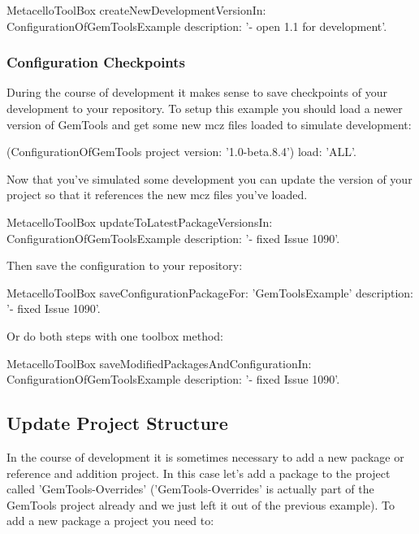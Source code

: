 \documentclass[a4paper,10pt,twoside]{book}
\begin{document}
\begin{code}{}
MetacelloToolBox
  createNewDevelopmentVersionIn: ConfigurationOfGemToolsExample
  description: '- open 1.1 for development'.
\end{code}

\subsubsection{Configuration Checkpoints}

During the course of development it makes sense to save checkpoints of your development to your repository. To setup this example you should load a newer version of GemTools and get some new mcz files loaded to simulate development:

\begin{code}{}
(ConfigurationOfGemTools project version: '1.0-beta.8.4')
  load: 'ALL'.
\end{code}  

Now that you've simulated some development you can update the  version of your project so that it references the new mcz files you've loaded.

\begin{code}{}
MetacelloToolBox
  updateToLatestPackageVersionsIn: ConfigurationOfGemToolsExample
  description: '- fixed Issue 1090'.
 \end{code} 
 
Then save the configuration to your repository:

\begin{code}{}
MetacelloToolBox
  saveConfigurationPackageFor: 'GemToolsExample'
  description: '- fixed Issue 1090'.
 \end{code}
    
Or do both steps with one toolbox method:

\begin{code}{}
MetacelloToolBox
  saveModifiedPackagesAndConfigurationIn: ConfigurationOfGemToolsExample
  description: '- fixed Issue 1090'.
\end{code}
  
\subsection{Update Project Structure}

In the course of development it is sometimes necessary to add a new package or reference and addition project. In this case let's add a package to the project called 'GemTools-Overrides' ('GemTools-Overrides' is actually part of the GemTools project already and we just left it out of the previous example). To add a new package a project you need to:
\end{document}
